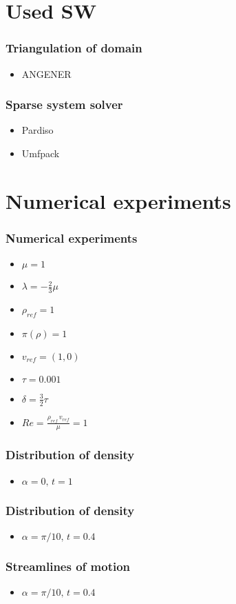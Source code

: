 \documentclass{beamer}
\begin{document}
\section{Used SW}

\frame
{
	\frametitle{Triangulation of domain}
	\begin{itemize}
    	\item ANGENER   
	\end{itemize}
}

\frame
{
	\frametitle{Sparse system solver}
	\begin{itemize}
    	\item Pardiso
    	\item Umfpack   
	\end{itemize}
}

\section{Numerical experiments}

\frame
{
	\frametitle{Numerical experiments}
	\begin{itemize}
		\item $\mu = 1$
		\item $\lambda = -\frac{2}{3}\mu$
		\item $\rho_{ref} = 1$
		\item $\pi(\rho) = 1$
		\item $v_{ref} = (1,0)$
		\item $\tau = 0.001$
		\item $\delta = \frac{3}{2}\tau$
		\item $Re=\frac{\rho_{ref}\,v_{ref}}{\mu} = 1$
	\end{itemize}
}

\frame
{
	\frametitle{Distribution of density}
	\begin{itemize}
    	\item $\alpha=0, \,t=1$
	\end{itemize}
}

\frame
{
	\frametitle{Distribution of density}
	\begin{itemize}
    	\item $\alpha=\pi/10, \,t=0.4$
	\end{itemize}
}

\frame
{
	\frametitle{Streamlines of motion}
	\begin{itemize}
    	\item $\alpha=\pi/10, \,t=0.4$
	\end{itemize}
}
\end{document}
